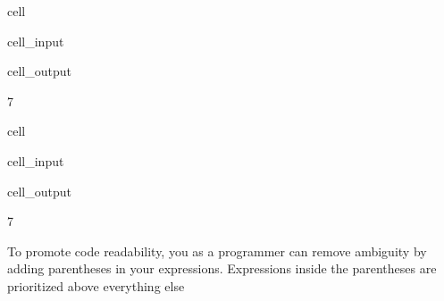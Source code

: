 \documentclass[letterpaper,10pt,english]{jupyterBook}
\begin{document}
\begin{sphinxuseclass}{cell}\begin{sphinxVerbatimInput}

\begin{sphinxuseclass}{cell_input}
\begin{sphinxVerbatim}[commandchars=\\\{\}]
     
\end{sphinxVerbatim}

\end{sphinxuseclass}\end{sphinxVerbatimInput}
\begin{sphinxVerbatimOutput}

\begin{sphinxuseclass}{cell_output}
\begin{sphinxVerbatim}[commandchars=\\\{\}]
7
\end{sphinxVerbatim}

\end{sphinxuseclass}\end{sphinxVerbatimOutput}

\end{sphinxuseclass}
\begin{sphinxuseclass}{cell}\begin{sphinxVerbatimInput}

\begin{sphinxuseclass}{cell_input}
\begin{sphinxVerbatim}[commandchars=\\\{\}]
    
\end{sphinxVerbatim}

\end{sphinxuseclass}\end{sphinxVerbatimInput}
\begin{sphinxVerbatimOutput}

\begin{sphinxuseclass}{cell_output}
\begin{sphinxVerbatim}[commandchars=\\\{\}]
7
\end{sphinxVerbatim}

\end{sphinxuseclass}\end{sphinxVerbatimOutput}

\end{sphinxuseclass}
\sphinxAtStartPar
To promote code readability, you as a programmer can remove ambiguity by adding parentheses in your expressions. Expressions inside the  parentheses are prioritized above everything else
\end{document}
